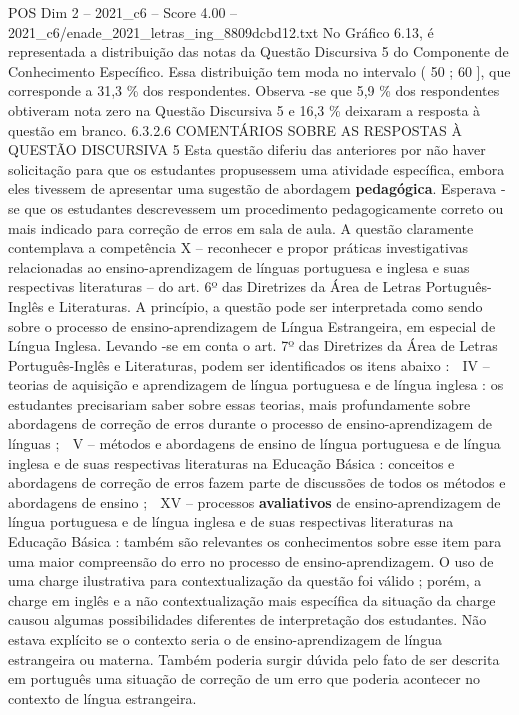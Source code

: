 \begin{textsample}{POS Dim 2 – 2021\_c6 – Score 4.00 – 2021\_c6/enade\_2021\_letras\_ing\_8809dcbd12.txt}
No Gráfico 6.13, é representada a distribuição das notas da Questão Discursiva 5 do Componente de Conhecimento Específico.
Essa distribuição tem moda no intervalo ( 50 ; 60 ], que corresponde a 31,3 \% dos respondentes.
Observa -se que 5,9 \% dos respondentes obtiveram nota zero na Questão Discursiva 5 e 16,3 \% deixaram a resposta à questão em branco. 6.3.2.6 COMENTÁRIOS SOBRE AS RESPOSTAS À QUESTÃO DISCURSIVA 5 Esta questão diferiu das anteriores por não haver solicitação para que os estudantes propusessem uma atividade específica, embora eles tivessem de apresentar uma sugestão de abordagem \textbf{pedagógica}.
Esperava -se que os estudantes descrevessem um procedimento pedagogicamente correto ou mais indicado para correção de erros em sala de aula.
A questão claramente contemplava a competência X – reconhecer e propor práticas investigativas relacionadas ao ensino-aprendizagem de línguas portuguesa e inglesa e suas respectivas literaturas – do art. 6º das Diretrizes da Área de Letras Português-Inglês e Literaturas.
A princípio, a questão pode ser interpretada como sendo sobre o processo de ensino-aprendizagem de Língua Estrangeira, em especial de Língua Inglesa.
Levando -se em conta o art. 7º das Diretrizes da Área de Letras Português-Inglês e Literaturas, podem ser identificados os itens abaixo :  IV – teorias de aquisição e aprendizagem de língua portuguesa e de língua inglesa : os estudantes precisariam saber sobre essas teorias, mais profundamente sobre abordagens de correção de erros durante o processo de ensino-aprendizagem de línguas ;  V – métodos e abordagens de ensino de língua portuguesa e de língua inglesa e de suas respectivas literaturas na Educação Básica : conceitos e abordagens de correção de erros fazem parte de discussões de todos os métodos e abordagens de ensino ;  XV – processos \textbf{avaliativos} de ensino-aprendizagem de língua portuguesa e de língua inglesa e de suas respectivas literaturas na Educação Básica : também são relevantes os conhecimentos sobre esse item para uma maior compreensão do erro no processo de ensino-aprendizagem.
O uso de uma charge ilustrativa para contextualização da questão foi válido ; porém, a charge em inglês e a não contextualização mais específica da situação da charge causou algumas possibilidades diferentes de interpretação dos estudantes.
Não estava explícito se o contexto seria o de ensino-aprendizagem de língua estrangeira ou materna.
Também poderia surgir dúvida pelo fato de ser descrita em português uma situação de correção de um erro que poderia acontecer no contexto de língua estrangeira.

\end{textsample}
